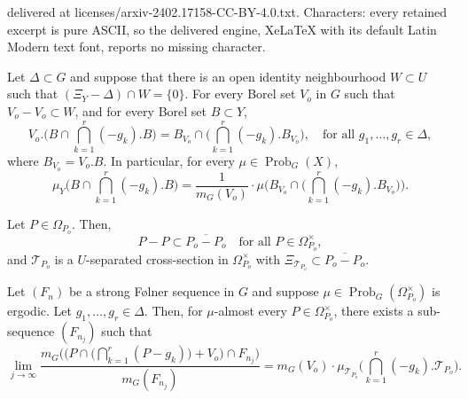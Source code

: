 \documentclass[10pt,a4paper]{amsart}
\DeclareMathOperator{\Prob}{Prob}
\newcommand{\cT}{\mathcal{T}}
\newcommand{\ra}{\rightarrow}
\begin{document}
delivered at licenses/arxiv-2402.17158-CC-BY-4.0.txt. Characters: every retained excerpt is pure ASCII, so the delivered engine, XeLaTeX with its default Latin Modern text font, reports no missing character.
\begin{lemma}
\label{Lemma_g1gr}
Let $\Delta \subset G$ and suppose that there is an open identity neighbourhood $W \subset U$ such that $(\Xi_Y - \Delta) \cap W = \{0\}$. For every Borel set $V_o$ in $G$ 
such that $V_o-V_o \subset W$, and for every Borel set $B \subset Y$, 
\[
V_o.\Big(B \cap \bigcap_{k=1}^r (-g_k).B\Big) = B_{V_o} \cap \Big( \bigcap_{k=1}^r (-g_k).B_{V_o}\Big), \quad \textrm{for all $g_1,\ldots,g_r \in \Delta$},
\]
where $B_{V_o} = V_o.B$. In particular, for every $\mu \in \Prob_G(X)$, 
\[
\mu_Y\Big( B \cap \bigcap_{k=1}^r (-g_k).B\Big)
= \frac{1}{m_G(V_o)} \cdot \mu\Big(B_{V_o} \cap \Big( \bigcap_{k=1}^r (-g_k).B_{V_o}\Big)\Big).
\]
\end{lemma}

\begin{lemma}
\label{Lemma_TransSep}
Let $P \in \Omega_{P_o}$. Then,  
\[
P-P \subset \overline{P_o - P_o} \quad \textrm{for all $P \in \Omega^{\times}_{P_o}$},
\] 
and $\cT_{P_o}$ is a $U$-separated cross-section in $\Omega_{P_o}^{\times}$ with 
$\Xi_{\cT_{P_o}} \subset \overline{P_o - P_o}$.
\end{lemma}

\begin{lemma}
\label{lemma3}
Let $(F_n)$ be a strong F\o lner sequence in $G$ and suppose $\mu \in \Prob_G(\Omega_{P_o}^{\times})$ is ergodic. Let $g_1,\ldots,g_r \in \Delta$. 
Then, for $\mu$-almost every $P \in \Omega_{P_o}^{\times}$, there exists a 
sub-sequence $(F_{n_j})$ such that
\[
\lim_{j \ra \infty}
\frac{m_G\big(\big(P \cap \big(\bigcap_{k=1}^r (P-g_k)\big)+V_o\big) \cap F_{n_j}\big)}{m_G(F_{n_j})}
= m_G(V_o) \cdot \mu_{\cT_{P_o}}\big(\bigcap_{k=1}^r (-g_k).\cT_{P_o}\big).
\]
\end{lemma}
\end{document}
